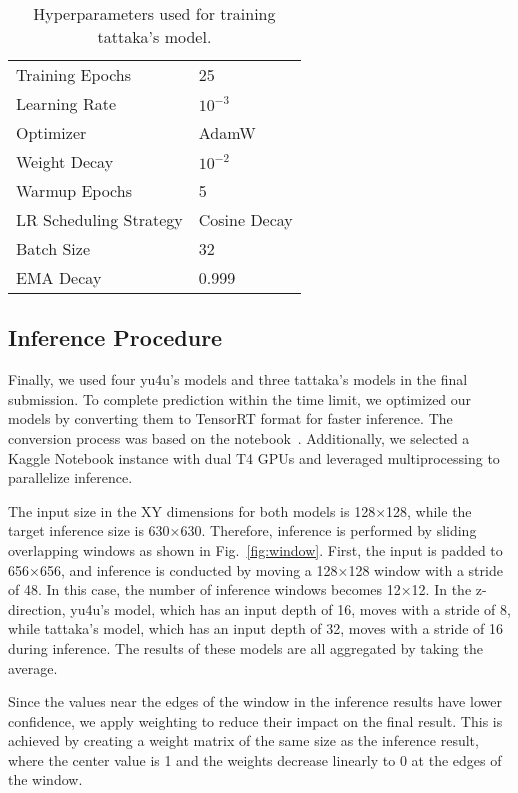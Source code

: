 \begin{table}[tb]
    \centering
    \footnotesize
    \begin{tabular}{ll}
        \toprule
        Training Epochs & 25 \\
        Learning Rate & $10^{-3}$ \\
        Optimizer & AdamW \\
        Weight Decay & $10^{-2}$ \\
        Warmup Epochs & 5 \\
        LR Scheduling Strategy & Cosine Decay \\
        Batch Size & 32 \\
        EMA Decay & 0.999 \\
        \bottomrule
    \end{tabular}
    \caption{Hyperparameters used for training tattaka's model.}
    \label{tab:hyperparams2}
\end{table}


\subsection{Inference Procedure}
Finally, we used four yu4u's models and three tattaka's models in the final submission.
To complete prediction within the time limit, we optimized our models by converting them to TensorRT format for faster inference. The conversion process was based on the notebook~\cite{Lion2025}.  
Additionally, we selected a Kaggle Notebook instance with dual T4 GPUs and leveraged multiprocessing to parallelize inference.

The input size in the XY dimensions for both models is 128×128, while the target inference size is 630×630. Therefore, inference is performed by sliding overlapping windows as shown in Fig.~\ref{fig:window}.
First, the input is padded to 656×656, and inference is conducted by moving a 128×128 window with a stride of 48. In this case, the number of inference windows becomes 12×12.
In the z-direction, yu4u's model, which has an input depth of 16, moves with a stride of 8, while tattaka's model, which has an input depth of 32, moves with a stride of 16 during inference.
The results of these models are all aggregated by taking the average.

Since the values near the edges of the window in the inference results have lower confidence, we apply weighting to reduce their impact on the final result.
This is achieved by creating a weight matrix of the same size as the inference result, where the center value is 1 and the weights decrease linearly to 0 at the edges of the window.


